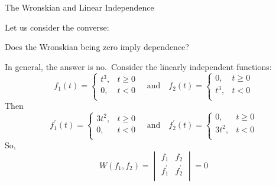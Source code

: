 \documentclass{beamer}
\begin{document}
\begin{frame}{The Wronskian and Linear Independence}
\begin{example}
Let us consider the converse:\begin{center}Does the Wronskian being zero imply dependence?\end{center}\pause

In general, the answer is no.\pause\ Consider the linearly independent functions:
\begin{equation*}
f_1(t)=
\begin{cases}
t^3, & t\geq 0 \\
0,   & t<0     \\
\end{cases}
\quad\text{and}\quad
f_2(t)=
\begin{cases}
0,   & t\geq 0 \\
t^3, & t<0     \\
\end{cases}
\end{equation*}\pause
Then
\begin{equation*}
f_1^\prime(t)=
\begin{cases}
3t^2, & t\geq 0 \\
0,   & t<0     \\
\end{cases}
\quad\text{and}\quad
f_2^\prime(t)=
\begin{cases}
0,   & t\geq 0 \\
3t^2, & t<0     \\
\end{cases}
\end{equation*}\pause
So,
\begin{equation*}
W(f_1,f_2) = 
\begin{vmatrix}
f_1        & f_2        \\
f_1^\prime & f_2^\prime \\
\end{vmatrix}
=0
\end{equation*}
\end{example}
\end{frame}
\end{document}
